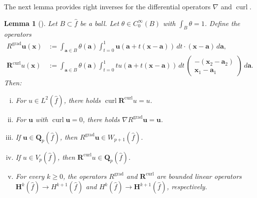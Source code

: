 \documentclass{article}
\newtheorem{lemma}[theorem]{Lemma}
\begin{document}
The next lemma provides right inverses for the differential operators $\nabla$ and $\operatorname{curl}$. 

\begin{lemma}
[\!]\label{lemma:mcintosh-2d} Let $B\subset\widehat{f}$ be a ball. Let $\theta\in C_{0}^{\infty}(B)$ with $\int_{B}%
\theta=1$. Define the operators
\begin{align*}
{R}^{\operatorname*{grad}}{\mathbf{u}}(\mathbf{x})  &  :=\int_{{\mathbf{a}}\in B} \theta(\mathbf{a})%
\int_{t=0}^{1}{\mathbf{u}}(\mathbf{a}+t(\mathbf{x}-{\mathbf{a}}))\,dt\cdot(\mathbf{x}-{\mathbf{a}%
})\,d{\mathbf{a}},\\
{\mathbf{R}}^{\operatorname*{curl}}{u}(\mathbf{x})  &  :=\int_{{\mathbf{a}}\in
B} \theta(\mathbf{a}) \int_{t=0}^{1}t{u}(\mathbf{a}+t(\mathbf{x}-{\mathbf{a}}))\,dt \, \left(\begin{array}{c}-(\mathbf{x}_2-\mathbf{a}_2)\\\mathbf{x}_1-\mathbf{a}_1\end{array}\right)\,d{\mathbf{a}}.
\end{align*}
Then:

\begin{enumerate}
[(i)]

\item 
\label{item:lemma:mcintosh-2d-i}
For $u\in L^2(\widehat{f})$, there holds
$\operatorname*{curl}{\mathbf{R}}^{\operatorname*{curl}}{u}=u$.

\item 
\label{item:lemma:mcintosh-2d-ii}
For ${\mathbf{u}}$ with $\operatorname*{curl}{\mathbf{u}}=0$, there
holds $\nabla{R}^{\operatorname*{grad}}{\mathbf{u}}={\mathbf{u}}$.

\item 
\label{item:lemma:mcintosh-2d-iii}
If ${\mathbf{u}}\in\mathbf{Q}_p(\widehat{f})$,
then ${R}^{\operatorname*{grad}}{\mathbf{u}}\in W_{p+1}(\widehat{f})$.

\item 
\label{item:lemma:mcintosh-2d-iv}
If ${u}\in V_p(\widehat{f})$, then ${\mathbf{R}}^{\operatorname*{curl}%
}{u}\in\mathbf{Q}_p(\widehat{f})$.

\item 
\label{item:lemma:mcintosh-2d-v}
For every $k\geq0$, the operators ${R}^{\operatorname*{grad}}$ and
${\mathbf{R}}^{\operatorname*{curl}}$ are bounded linear operators
$\mathbf{H}^{k}(\widehat{f})\rightarrow H^{k+1}(\widehat{f})$ and $H^{k}(\widehat{f})\rightarrow \mathbf{H}^{k+1}(\widehat{f})$, respectively.
\end{enumerate}
\end{lemma}
\end{document}
